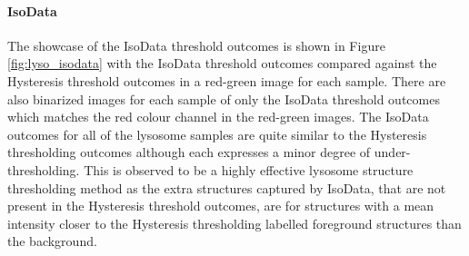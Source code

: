 \paragraph{IsoData} The showcase of the IsoData threshold outcomes is shown in Figure \ref{fig:lyso_isodata} with the IsoData threshold outcomes compared against the Hysteresis threshold outcomes in a red-green image for each sample. There are also binarized images for each sample of only the IsoData threshold outcomes which matches the red colour channel in the red-green images. The IsoData outcomes for all of the lysosome samples are quite similar to the Hysteresis thresholding outcomes although each expresses a minor degree of under-thresholding. This is observed to be a highly effective lysosome structure thresholding method as the extra structures captured by IsoData, that are not present in the Hysteresis threshold outcomes, are for structures with a mean intensity closer to the Hysteresis thresholding labelled foreground structures than the background.

